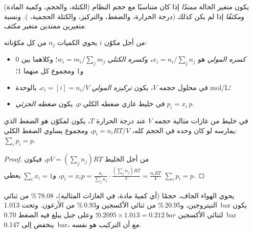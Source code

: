 \begin{definition}\label{def:b1:extent-q-and-k:variables}
يكون متغير الحالة \emph{ممتدًا} إذا كان
متناسبًا مع حجم النظام (الكتلة، والحجم، وكمية
المادة) و\emph{مكثفًا} إذا لم يكن كذلك
(درجة الحرارة، والضغط، والتركيز، والكتلة الحجمية، ). ونسبة
متغيرين ممتدين متغير مكثف.
\end{definition}

\begin{definition}\label{def:b1:extent-q-and-k:composition}
من أجل مكوّن $i$  يحوي الكميات $n_j$ من كل
مكوّناته:
\begin{itemize}
  \item \emph{كسره المولي} هو $x_i = n_i/\sum_j
        n_j$، و\emph{كسره الكتلي} $w_i =
        m_i/\sum_j m_j$؛ وكلاهما بين 0 و1 ومجموع كل منهما 1؛
  \item في محلول حجمه $V$، يكون \emph{تركيزه
        المولي} $c_i = [i] = n_i/V$،
        بالوحدة \unit{mol/L}؛
  \item في خليط غازي ضغطه الكلي $p$، يكون \emph{ضغطه
        الجزئي} $p_i = x_i\,p$.
\end{itemize}
\end{definition}

\begin{proposition}\label{prop:b1:extent-q-and-k:dalton}
في خليط من غازات مثالية حجمه $V$ عند درجة الحرارة $T$، يكون
 لمكوّن هو الضغط الذي يمارسه لو كان وحده في
الحجم كله، $p_i = n_iRT/V$، ومجموع  يساوي
الضغط الكلي: $\sum_i p_i = p$.
\end{proposition}

\begin{proof}
من أجل الخليط $pV = (\sum_j n_j)RT$، فيكون $p_i = x_i p = \frac{n_i}{\sum_j
n_j}\cdot\frac{(\sum_j n_j)RT}{V} = \frac{n_iRT}{V}$، و$\sum_i x_i = 1$
يعطي $\sum_i p_i = p$.
\end{proof}

\begin{example}[الهواء]\label{ex:b1:extent-q-and-k:air}
يحوي الهواء الجاف، حجمًا (أي كميةَ مادة، في الغازات المثالية)،
78.08\,\% من ثنائي النيتروجين، و20.95\,\% من ثنائي الأكسجين و0.93\,\% من الأرغون. وتحت
\qty{1.013}{bar} يكون  لثنائي الأكسجين $0.2095 \times
1.013 = \qty{0.212}{bar}$؛ وعلى جبل يبلغ فيه الضغط
\qty{0.70}{bar} ينخفض إلى \qty{0.147}{bar}، مع أن التركيب
هو نفسه.
\end{example}

